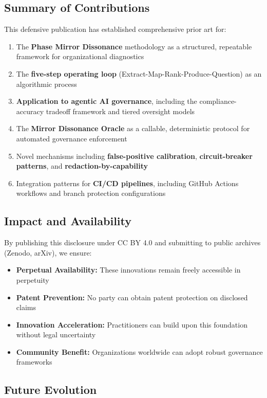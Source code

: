 \documentclass[11pt,a4paper]{article}
\begin{document}
\subsection{Summary of Contributions}

This defensive publication has established comprehensive prior art for:

\begin{enumerate}
\item The \textbf{Phase Mirror Dissonance} methodology as a structured, repeatable framework for organizational diagnostics
\item The \textbf{five-step operating loop} (Extract-Map-Rank-Produce-Question) as an algorithmic process
\item \textbf{Application to agentic AI governance}, including the compliance-accuracy tradeoff framework and tiered oversight models
\item The \textbf{Mirror Dissonance Oracle} as a callable, deterministic protocol for automated governance enforcement
\item Novel mechanisms including \textbf{false-positive calibration}, \textbf{circuit-breaker patterns}, and \textbf{redaction-by-capability}
\item Integration patterns for \textbf{CI/CD pipelines}, including GitHub Actions workflows and branch protection configurations
\end{enumerate}

\subsection{Impact and Availability}

By publishing this disclosure under CC BY 4.0 and submitting to public archives (Zenodo, arXiv), we ensure:

\begin{itemize}
\item \textbf{Perpetual Availability:} These innovations remain freely accessible in perpetuity
\item \textbf{Patent Prevention:} No party can obtain patent protection on disclosed claims
\item \textbf{Innovation Acceleration:} Practitioners can build upon this foundation without legal uncertainty
\item \textbf{Community Benefit:} Organizations worldwide can adopt robust governance frameworks
\end{itemize}

\subsection{Future Evolution}
\end{document}
